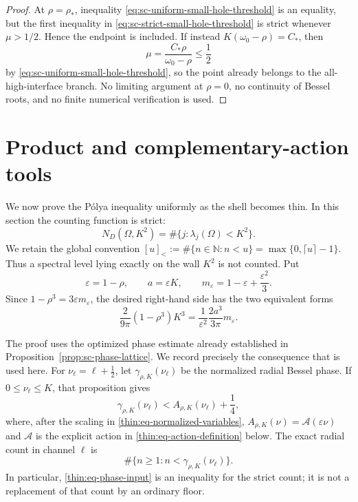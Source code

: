 \documentclass[11pt]{article}
\numberwithin{equation}{section}
\theoremstyle{definition}
\theoremstyle{remark}
\begin{document}
\begin{proof}
At \(\rho=\rho_*\), inequality
\eqref{eq:sc-uniform-small-hole-threshold} is an equality, but the first
inequality in \eqref{eq:sc-strict-small-hole-threshold} is strict whenever
\(\mu>1/2\).  Hence the endpoint is included.  If instead
\(K(\omega_0-\rho)=C_*\), then
\[
  \mu=\frac{C_*\rho}{\omega_0-\rho}\le\frac12
\]
by \eqref{eq:sc-uniform-small-hole-threshold}, so the point already belongs
to the all-high-interface branch.  No limiting argument at \(\rho=0\), no
continuity of Bessel roots, and no finite numerical verification is used.
\end{proof}

\section{Product and complementary-action tools}
\label{sec:product-action-tools}

We now prove the P\'olya inequality uniformly as the shell becomes thin.  In
this section the counting function is strict:
\[
  N_D(\Omega,K^2)=\#\{j:\lambda_j(\Omega)<K^2\}.
\]
We retain the global convention
\([u]_<:=\#\{n\in\mathbb N:n<u\}=\max\{0,\lceil u\rceil-1\}\).
Thus a spectral level lying exactly on the wall \(K^2\) is not counted.  Put
\begin{equation}
  \varepsilon=1-\rho,
  \qquad a=\varepsilon K,
  \qquad
  m_\varepsilon=1-\varepsilon+\frac{\varepsilon^2}{3}.
  \label{thin:eq-normalized-variables}
\end{equation}
Since \(1-\rho^3=3\varepsilon m_\varepsilon\), the desired right-hand side
has the two equivalent forms
\begin{equation}
  \frac{2}{9\pi}(1-\rho^3)K^3
  =\frac{1}{\varepsilon^2}\frac{2a^3}{3\pi}m_\varepsilon.
  \label{thin:eq-weyl-normalization}
\end{equation}

The proof uses the optimized phase estimate already established in
Proposition~\ref{prop:sc-phase-lattice}.  We record precisely the consequence
that is used here.  For
\(\nu_\ell=\ell+\tfrac12\), let
\(\gamma_{\rho,K}(\nu_\ell)\) be the normalized radial Bessel phase.  If
\(0\leq\nu_\ell\leq K\), that proposition gives
\begin{equation}
  \gamma_{\rho,K}(\nu_\ell)
  < A_{\rho,K}(\nu_\ell)+\frac14,
  \label{thin:eq-phase-input}
\end{equation}
where, after the scaling in \eqref{thin:eq-normalized-variables},
\(A_{\rho,K}(\nu)=\mathcal A(\varepsilon\nu)\) and
\(\mathcal A\) is the explicit action in
\eqref{thin:eq-action-definition} below.  The exact radial count in channel
\(\ell\) is
\begin{equation}
  \#\{n\geq1:n<\gamma_{\rho,K}(\nu_\ell)\}.
  \label{thin:eq-exact-phase-count}
\end{equation}
In particular, \eqref{thin:eq-phase-input} is an inequality for the strict
count; it is not a replacement of that count by an ordinary floor.
\end{document}
